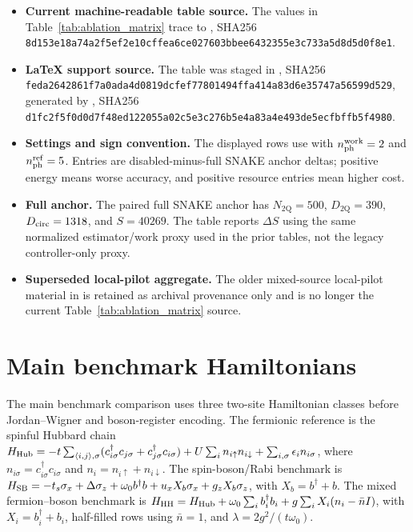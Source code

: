 \documentclass[
  reprint,
  amsmath,
  amssymb,
  aps,
  pra,
  nofootinbib,
  superscriptaddress,
  floatfix
]{revtex4-2}
\newcommand{\hh}{\mathrm{HH}}
\newcommand{\twq}{\mathrm{2Q}}
\begin{document}
\begin{itemize}
\item \textbf{Current machine-readable table source.} The values in Table~\ref{tab:ablation_matrix} trace to , SHA256 \texttt{8d153e18a74a2f5ef2e10cffea6ce027603bbee6432355e3c733a5d8d5d0f8e1}.
\item \textbf{LaTeX support source.} The table was staged in , SHA256 \texttt{feda2642861f7a0ada4d0819dcfef77801494ffa414a83d6e35747a56599d529}, generated by , SHA256 \texttt{d1fc2f5f0d0d7f48ed122055a02c5e3c276b5e4a83a4e493de5ecfbffb5f4980}.
\item \textbf{Settings and sign convention.} The displayed rows use  with $n_{\rm ph}^{\rm work}=2$ and $n_{\rm ph}^{\rm ref}=5$. Entries are disabled-minus-full SNAKE anchor deltas; positive energy means worse accuracy, and positive resource entries mean higher cost.
\item \textbf{Full anchor.} The paired full SNAKE anchor has $N_{\twq}=500$, $D_{\twq}=390$, $D_{\rm circ}=1318$, and $S=40269$. The table reports $\Delta S$ using the same normalized estimator/work proxy used in the prior tables, not the legacy controller-only proxy.
\item \textbf{Superseded local-pilot aggregate.} The older mixed-source local-pilot material in  is retained as archival provenance only and is no longer the current Table~\ref{tab:ablation_matrix} source.
\end{itemize}

\fi







\section{Main benchmark Hamiltonians}
\label{app:hamiltonian_families}

The main benchmark comparison uses three two-site Hamiltonian classes
before Jordan--Wigner and boson-register encoding.  The fermionic reference is
the spinful Hubbard chain
\(H_{\rm Hub}=-t\sum_{\langle i,j\rangle,\sigma}
(c_{i\sigma}^{\dagger}c_{j\sigma}+c_{j\sigma}^{\dagger}c_{i\sigma})
+U\sum_i n_{i\uparrow}n_{i\downarrow}
+\sum_{i,\sigma}\epsilon_i n_{i\sigma}\), where
\(n_{i\sigma}=c_{i\sigma}^{\dagger}c_{i\sigma}\) and
\(n_i=n_{i\uparrow}+n_{i\downarrow}\).  The spin-boson/Rabi benchmark is
\(H_{\rm SB}=-t_s\sigma_x+\Delta\sigma_z+\omega_0 b^\dagger b
+u_xX_b\sigma_x+g_zX_b\sigma_z\), with \(X_b=b^\dagger+b\).  The mixed
fermion--boson benchmark is
\(H_{\hh}=H_{\rm Hub}+\omega_0\sum_i b_i^\dagger b_i
+g\sum_iX_i(n_i-\bar n I)\), with \(X_i=b_i^\dagger+b_i\), half-filled
rows using \(\bar n=1\), and \(\lambda=2g^2/(t\omega_0)\).
\end{document}
